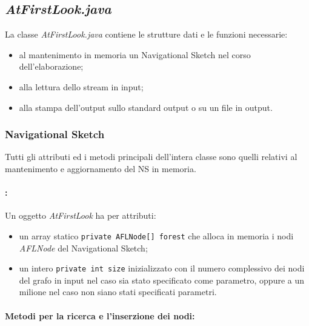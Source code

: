 \documentclass[a4paper,11pt]{report}
\begin{document}
\subsection{\emph{AtFirstLook.java}}
La classe \emph{AtFirstLook.java} contiene le strutture dati e le funzioni necessarie:
\begin{itemize}
 \item al mantenimento in memoria un Navigational Sketch nel corso dell'elaborazione;
 \item alla lettura dello stream in input;
 \item alla stampa dell'output sullo standard output o su un file in output.
\end{itemize}
\subsubsection{Navigational Sketch}
Tutti gli attributi ed i metodi principali dell'intera classe sono quelli relativi al mantenimento e aggiornamento del NS in memoria.
\paragraph{\emph{}:} Un oggetto \emph{AtFirstLook} ha per attributi:
\begin{itemize}
 \item un array statico \verb|private AFLNode[] forest| che alloca in memoria i nodi \emph{AFLNode} del Navigational Sketch;
 \item un intero \verb|private int size| inizializzato con il numero complessivo dei nodi del grafo in input nel caso sia stato specificato
come parametro, oppure a un milione
nel caso non siano stati specificati parametri.
\end{itemize}

\paragraph{Metodi per la ricerca e l'inserzione dei nodi:}
\end{document}
